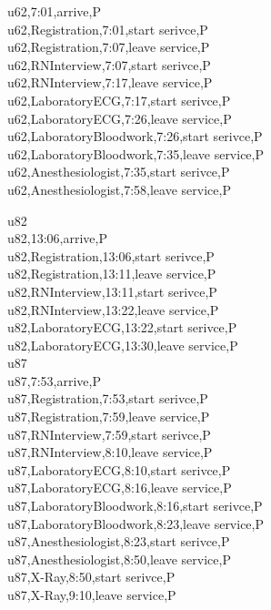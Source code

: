 \documentclass[12pt]{article}
\begin{document}
u62,7:01,arrive,P\\
u62,Registration,7:01,start serivce,P\\
u62,Registration,7:07,leave service,P\\
u62,RNInterview,7:07,start serivce,P\\
u62,RNInterview,7:17,leave service,P\\
u62,LaboratoryECG,7:17,start serivce,P\\
u62,LaboratoryECG,7:26,leave service,P\\
u62,LaboratoryBloodwork,7:26,start serivce,P\\
u62,LaboratoryBloodwork,7:35,leave service,P\\
u62,Anesthesiologist,7:35,start serivce,P\\
u62,Anesthesiologist,7:58,leave service,P\\

\quad

u82\\

u82,13:06,arrive,P\\
u82,Registration,13:06,start serivce,P\\
u82,Registration,13:11,leave service,P\\
u82,RNInterview,13:11,start serivce,P\\
u82,RNInterview,13:22,leave service,P\\
u82,LaboratoryECG,13:22,start serivce,P\\
u82,LaboratoryECG,13:30,leave service,P\\


u87\\

u87,7:53,arrive,P\\
u87,Registration,7:53,start serivce,P\\
u87,Registration,7:59,leave service,P\\
u87,RNInterview,7:59,start serivce,P\\
u87,RNInterview,8:10,leave service,P\\
u87,LaboratoryECG,8:10,start serivce,P\\
u87,LaboratoryECG,8:16,leave service,P\\
u87,LaboratoryBloodwork,8:16,start serivce,P\\
u87,LaboratoryBloodwork,8:23,leave service,P\\
u87,Anesthesiologist,8:23,start serivce,P\\
u87,Anesthesiologist,8:50,leave service,P\\
u87,X-Ray,8:50,start serivce,P\\
u87,X-Ray,9:10,leave service,P\\
\end{document}
